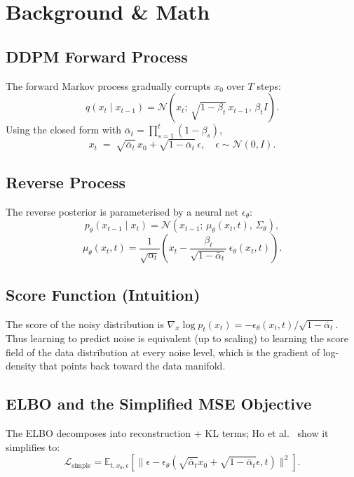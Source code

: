\documentclass[conference]{IEEEtran}
\begin{document}
\section{Background \& Math}

\subsection{DDPM Forward Process}
The forward Markov process gradually corrupts $x_0$ over $T$ steps:
\begin{equation}
q(x_t \mid x_{t-1}) = \mathcal{N}\!\left(x_t;\, \sqrt{1-\beta_t}\,x_{t-1},\, \beta_t I\right).
\end{equation}
Using the closed form with
$\bar{\alpha}_t = \prod_{s=1}^t (1-\beta_s)$,
\begin{equation}
x_t \;=\; \sqrt{\bar{\alpha}_t}\,x_0 + \sqrt{1-\bar{\alpha}_t}\,\epsilon,
\quad \epsilon \sim \mathcal{N}(0, I).
\end{equation}

\subsection{Reverse Process}
The reverse posterior is parameterised by a neural net $\epsilon_\theta$:
\begin{equation}
p_\theta(x_{t-1}\mid x_t) = \mathcal{N}\!\left(x_{t-1};\, \mu_\theta(x_t,t),\, \Sigma_\theta\right),
\end{equation}
\begin{equation}
\mu_\theta(x_t,t) = \frac{1}{\sqrt{\alpha_t}}\!\left(x_t - \frac{\beta_t}{\sqrt{1-\bar{\alpha}_t}}\,\epsilon_\theta(x_t,t)\right).
\end{equation}

\subsection{Score Function (Intuition)}
The score of the noisy distribution is
$\nabla_x \log p_t(x_t) = -\epsilon_\theta(x_t,t) / \sqrt{1-\bar{\alpha}_t}$.
Thus learning to predict noise is equivalent (up to scaling) to
learning the score field of the data distribution at every noise
level, which is the gradient of log-density that points back toward
the data manifold.

\subsection{ELBO and the Simplified MSE Objective}
The ELBO decomposes into reconstruction + KL terms; Ho et
al.~\cite{ho2020ddpm} show it simplifies to:
\begin{equation}
\mathcal{L}_{\text{simple}} =
\mathbb{E}_{t,x_0,\epsilon}\!\left[\big\|\epsilon - \epsilon_\theta(\sqrt{\bar{\alpha}_t}x_0 + \sqrt{1-\bar{\alpha}_t}\epsilon, t)\big\|^2\right].
\end{equation}
\end{document}
